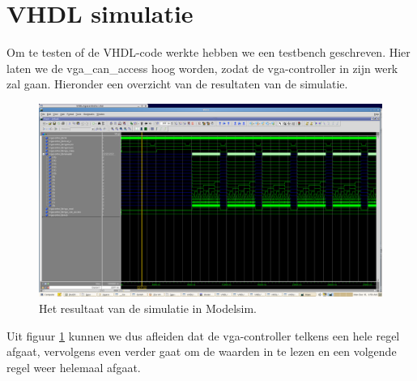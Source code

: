 \documentclass{scrartcl}  %
\begin{document}
\section{VHDL simulatie}
Om te testen of de VHDL-code werkte hebben we een testbench geschreven. Hier laten we de vga\_can\_access hoog worden, zodat de vga-controller in zijn werk zal gaan. Hieronder een overzicht van de resultaten van de simulatie.
\begin{figure}[H]
\centering
		\includegraphics[width=1\textwidth]{resource/simmodvgafinal.png}
		
		\caption{Het resultaat van de simulatie in Modelsim.}
		\label{fig:sim}
\end{figure}
Uit figuur \ref{fig:sim} kunnen we dus afleiden dat de vga-controller telkens een hele regel afgaat, vervolgens even verder gaat om de waarden in te lezen en een volgende regel weer helemaal afgaat. 
\end{document}
